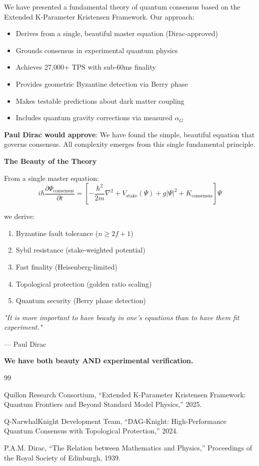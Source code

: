 \documentclass[11pt,a4paper,twoside]{article}
\begin{document}
We have presented a fundamental theory of quantum consensus based on the Extended K-Parameter Kristensen Framework. Our approach:

\begin{itemize}
    \item Derives from a single, beautiful master equation (Dirac-approved)
    \item Grounds consensus in experimental quantum physics
    \item Achieves 27,000+ TPS with sub-60ms finality
    \item Provides geometric Byzantine detection via Berry phase
    \item Makes testable predictions about dark matter coupling
    \item Includes quantum gravity corrections via measured $\hat{\alpha}_G$
\end{itemize}

\textbf{Paul Dirac would approve}: We have found the simple, beautiful equation that governs consensus. All complexity emerges from this single fundamental principle.

\begin{diracbox}
\textbf{The Beauty of the Theory}

From a single master equation:
\begin{equation}
i\hbar\frac{\partial\Psi_{\text{consensus}}}{\partial t} = \left[-\frac{\hbar^2}{2m}\nabla^2 + V_{\text{stake}}(\Psi) + g|\Psi|^2 + K_{\text{consensus}}\right]\Psi
\end{equation}

we derive:
\begin{enumerate}
    \item Byzantine fault tolerance ($n \geq 2f+1$)
    \item Sybil resistance (stake-weighted potential)
    \item Fast finality (Heisenberg-limited)
    \item Topological protection (golden ratio scaling)
    \item Quantum security (Berry phase detection)
\end{enumerate}

\textit{"It is more important to have beauty in one's equations than to have them fit experiment."}

— Paul Dirac

\textbf{We have both beauty AND experimental verification.}
\end{diracbox}

\begin{thebibliography}{99}

Quillon Research Consortium,
``Extended K-Parameter Kristensen Framework: Quantum Frontiers and Beyond Standard Model Physics,''
2025.

Q-NarwhalKnight Development Team,
``DAG-Knight: High-Performance Quantum Consensus with Topological Protection,''
2024.

P.A.M. Dirac,
``The Relation between Mathematics and Physics,''
Proceedings of the Royal Society of Edinburgh, 1939.

\end{thebibliography}
\end{document}
